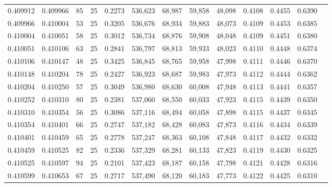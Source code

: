 \begin{tabular}{rrrrrrrrrrrrr}
0.409912 & 0.409966 &    85 &  25 &                                     0.2273 & 536,623 &  68,987 &  59,858 &  48,098 & 0.4108 & 0.4455 & 0.6390 \\
0.409966 & 0.410004 &    53 &  25 &                                     0.3205 & 536,676 &  68,934 &  59,883 &  48,073 & 0.4109 & 0.4453 & 0.6385 \\
0.410004 & 0.410051 &    58 &  25 &                                     0.3012 & 536,734 &  68,876 &  59,908 &  48,048 & 0.4109 & 0.4451 & 0.6380 \\
0.410051 & 0.410106 &    63 &  25 &                                     0.2841 & 536,797 &  68,813 &  59,933 &  48,023 & 0.4110 & 0.4448 & 0.6374 \\
0.410106 & 0.410147 &    48 &  25 &                                     0.3425 & 536,845 &  68,765 &  59,958 &  47,998 & 0.4111 & 0.4446 & 0.6370 \\
0.410148 & 0.410204 &    78 &  25 &                                     0.2427 & 536,923 &  68,687 &  59,983 &  47,973 & 0.4112 & 0.4444 & 0.6362 \\
0.410204 & 0.410250 &    57 &  25 &                                     0.3049 & 536,980 &  68,630 &  60,008 &  47,948 & 0.4113 & 0.4441 & 0.6357 \\
0.410252 & 0.410310 &    80 &  25 &                                     0.2381 & 537,060 &  68,550 &  60,033 &  47,923 & 0.4115 & 0.4439 & 0.6350 \\
0.410310 & 0.410354 &    56 &  25 &                                     0.3086 & 537,116 &  68,494 &  60,058 &  47,898 & 0.4115 & 0.4437 & 0.6345 \\
0.410354 & 0.410401 &    66 &  25 &                                     0.2747 & 537,182 &  68,428 &  60,083 &  47,873 & 0.4116 & 0.4434 & 0.6339 \\
0.410401 & 0.410459 &    65 &  25 &                                     0.2778 & 537,247 &  68,363 &  60,108 &  47,848 & 0.4117 & 0.4432 & 0.6332 \\
0.410459 & 0.410525 &    82 &  25 &                                     0.2336 & 537,329 &  68,281 &  60,133 &  47,823 & 0.4119 & 0.4430 & 0.6325 \\
0.410525 & 0.410597 &    94 &  25 &                                     0.2101 & 537,423 &  68,187 &  60,158 &  47,798 & 0.4121 & 0.4428 & 0.6316 \\
0.410599 & 0.410653 &    67 &  25 &                                     0.2717 & 537,490 &  68,120 &  60,183 &  47,773 & 0.4122 & 0.4425 & 0.6310 \\

\end{tabular}
